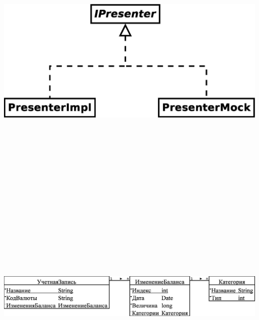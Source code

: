 \documentclass[russian,utf8,a1paper,nostitching,simple]{eskdgraph}
\begin{document}
\begin{ESKDdrawing}
\begin{minipage}{50cm}
  \end{minipage}
  \hspace{2cm}
  \begin{minipage}{30cm}
    \centering
     \\
    \vspace{2cm}
    \centering
    \includegraphics[height=13cm]{fig/implementation_testing_presenter.eps}
  \end{minipage}

  \vspace{4cm}
  \centering
   \\
  \vspace{2cm}
  \centering
  \includegraphics[height=10cm]{fig/design_entities.eps}
\end{ESKDdrawing}

\setcounter{page}{1}
\begin{ESKDdrawing}
\end{ESKDdrawing}
\end{document}
